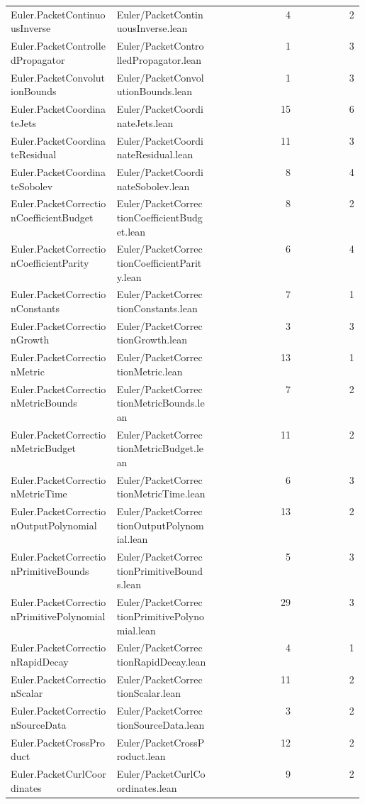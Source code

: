 \begin{longtable}{p{0.30\linewidth}p{0.28\linewidth}rr}
Euler.PacketContinuousInverse & Euler/PacketContinuousInverse.lean & 4 & 2\\
Euler.PacketControlledPropagator & Euler/PacketControlledPropagator.lean & 1 & 3\\
Euler.PacketConvolutionBounds & Euler/PacketConvolutionBounds.lean & 1 & 3\\
Euler.PacketCoordinateJets & Euler/PacketCoordinateJets.lean & 15 & 6\\
Euler.PacketCoordinateResidual & Euler/PacketCoordinateResidual.lean & 11 & 3\\
Euler.PacketCoordinateSobolev & Euler/PacketCoordinateSobolev.lean & 8 & 4\\
Euler.PacketCorrectionCoefficientBudget & Euler/PacketCorrectionCoefficientBudget.lean & 8 & 2\\
Euler.PacketCorrectionCoefficientParity & Euler/PacketCorrectionCoefficientParity.lean & 6 & 4\\
Euler.PacketCorrectionConstants & Euler/PacketCorrectionConstants.lean & 7 & 1\\
Euler.PacketCorrectionGrowth & Euler/PacketCorrectionGrowth.lean & 3 & 3\\
Euler.PacketCorrectionMetric & Euler/PacketCorrectionMetric.lean & 13 & 1\\
Euler.PacketCorrectionMetricBounds & Euler/PacketCorrectionMetricBounds.lean & 7 & 2\\
Euler.PacketCorrectionMetricBudget & Euler/PacketCorrectionMetricBudget.lean & 11 & 2\\
Euler.PacketCorrectionMetricTime & Euler/PacketCorrectionMetricTime.lean & 6 & 3\\
Euler.PacketCorrectionOutputPolynomial & Euler/PacketCorrectionOutputPolynomial.lean & 13 & 2\\
Euler.PacketCorrectionPrimitiveBounds & Euler/PacketCorrectionPrimitiveBounds.lean & 5 & 3\\
Euler.PacketCorrectionPrimitivePolynomial & Euler/PacketCorrectionPrimitivePolynomial.lean & 29 & 3\\
Euler.PacketCorrectionRapidDecay & Euler/PacketCorrectionRapidDecay.lean & 4 & 1\\
Euler.PacketCorrectionScalar & Euler/PacketCorrectionScalar.lean & 11 & 2\\
Euler.PacketCorrectionSourceData & Euler/PacketCorrectionSourceData.lean & 3 & 2\\
Euler.PacketCrossProduct & Euler/PacketCrossProduct.lean & 12 & 2\\
Euler.PacketCurlCoordinates & Euler/PacketCurlCoordinates.lean & 9 & 2\\

\end{longtable}
